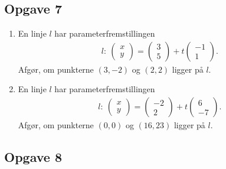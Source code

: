 \subsection*{Opgave 7}
\begin{enumerate}[label=\roman*)]
	\item En linje $l$ har parameterfremstillingen
	\begin{align*}
		l: \ 
		\begin{pmatrix}
			x \\ y
		\end{pmatrix}=
		\begin{pmatrix}
			3 \\5
		\end{pmatrix} + t
		\begin{pmatrix}
			-1 \\ 1
		\end{pmatrix}.
	\end{align*}
	Afgør, om punkterne $(3,-2)$ og $(2,2)$ ligger på $l$. 
	\item En linje $l$ har parameterfremstillingen
	\begin{align*}
		l: \ 
		\begin{pmatrix}
			x \\ y
		\end{pmatrix}=
		\begin{pmatrix}
			-2 \\2
		\end{pmatrix} + t
		\begin{pmatrix}
			6 \\ -7  
		\end{pmatrix}.
	\end{align*}
	Afgør, om punkterne $(0,0)$ og $(16,23)$ ligger på $l$. 
\end{enumerate}

\subsection*{Opgave 8}

